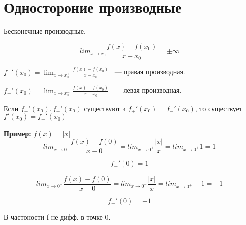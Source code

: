 ﻿\section{Одностороние производные}
\begin{Rem}
 Бесконечные производные. 

 $$ lim_{x \to x_0}\frac{f(x) - f(x_0)}{x - x_0} = \pm \infty$$
\end{Rem}

\begin{Def}

$f_+'(x_0) = \lim_{x \to x_0^+}\frac{f(x) - f(x_0)}{x - x_0}$ ~--- правая производная.


$f_-'(x_0) = \lim_{x \to x_0^-}\frac{f(x) - f(x_0)}{x - x_0}$ ~--- левая производная.

\end{Def}

\begin{Rem}
 Если $f_+'(x_0), f_-'(x_0)$ существуют и $f_+'(x_0) = f_-'(x_0)$, то существует $f'(x_0) = f_+'(x_0)$
\end{Rem}

{\bf Пример:} $f(x) = |x|$ 
$$lim_{x \to 0^+} \frac{f(x) - f(0)}{x - 0} = lim_{x \to 0^+}\frac{|x|}{x} = lim_{x \to 0^+} 1 = 1$$

$$f_+'(0) = 1$$

$$lim_{x \to 0^-} \frac{f(x) - f(0)}{x - 0} = lim_{x \to 0^-}\frac{|x|}{x} = lim_{x \to 0^+} -1 = -1$$

$$f_-'(0) = -1$$

В частоности f не дифф. в точке 0.

